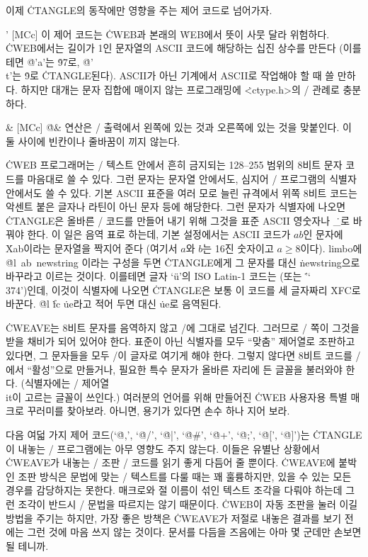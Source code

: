 \subsec
이제 \.{CTANGLE}의 동작에만 영향을 주는 제어 코드로 넘어가자.

\@' [MCc] 이 제어 코드는 \.{CWEB}과 본래의 \.{WEB}에서 뜻이 사뭇 달라 위험하다.
\.{CWEB}에서는 길이가 1인 문자열의 ASCII 코드에 해당하는 십진 상수를 만든다
(이를테면 \.{@'a'}는 \.{97}로, \.{@'\\t'}는 \.9로 \.{CTANGLE}된다). ASCII가
아닌 기계에서 ASCII로 작업해야 할 때 쓸 만하다. 하지만 대개는 문자 집합에 매이지
않는 프로그래밍에 \.{<ctype.h>}의 \CEE/ 관례로 충분하다.

\@\& [MCc] \.{@\&} 연산은 \CEE/ 출력에서 왼쪽에 있는 것과 오른쪽에 있는 것을
맞붙인다. 이 둘 사이에 빈칸이나 줄바꿈이 끼지 않는다.

\@l [L] \.{CWEB} 프로그래머는 \TEX/ 텍스트 안에서 흔히 금지되는 128--255 범위의
8비트 문자 코드를 마음대로 쓸 수 있다. 그런 문자는 문자열 안에서도, 심지어
\CEE/ 프로그램의 식별자 안에서도 쓸 수 있다. 기본 ASCII 표준을 여러 모로 늘린
규격에서 위쪽 8비트 코드는 악센트 붙은 글자나 라틴이 아닌 문자 등에 해당한다.
그런 문자가 식별자에 나오면 \.{CTANGLE}은 올바른 \CEE/ 코드를 만들어 내기 위해
그것을 표준 ASCII 영숫자나 \.{\_}로 바꿔야 한다. 이 일은 음역 표로 하는데, 기본
설정에서는 ASCII 코드가 \T{\^}$ab$인 문자에 \.{Xab}이라는 문자열을 짝지어 준다
(여기서 $a$와 $b$는 16진 숫자이고 $a\ge8$이다). limbo에 \.{@l\ ab\ newstring}
이라는 구성을 두면 \.{CTANGLE}에게 그 문자를 대신 \.{newstring}으로 바꾸라고
이르는 것이다. 이를테면 글자 `\"u'의 ISO Latin-1 코드는 
(또는 \.{'\char`\\374'})인데, 이것이 식별자에 나오면 \.{CTANGLE}은 보통 이 코드를
세 글자짜리 \.{XFC}로 바꾼다. \.{@l} \.{fc} \.{ue}라고 적어 두면 대신 \.{ue}로
음역된다.

\more \.{CWEAVE}는 8비트 문자를 음역하지 않고 \TEX/에 그대로 넘긴다. 그러므로
\TEX/ 쪽이 그것을 받을 채비가 되어 있어야 한다. 표준이 아닌 식별자를 모두
``맞춤'' 제어열로 조판하고 있다면, 그 문자들을 모두 \TEX/이 글자로 여기게 해야
한다. 그렇지 않다면 8비트 코드를 \TEX/에서 ``활성''으로 만들거나, 필요한 특수
문자가 올바른 자리에 든 글꼴을 불러와야 한다. (식별자에는 \TEX/ 제어열 \.{\\it}이
고르는 글꼴이 쓰인다.) 여러분의 언어를 위해 만들어진 \.{CWEB} 사용자용 특별 매크로
꾸러미를 찾아보라. 아니면, 용기가 있다면 손수 하나 지어 보라.

\subsec
다음 여덟 가지 제어 코드(`\.{@,}', `\.{@/}', `\.{@|}', `\.{@\#}', `\.{@+}',
`\.{@;}', `\.{@[}', `\.{@]}')는 \.{CTANGLE}이 내놓는 \CEE/ 프로그램에는 아무
영향도 주지 않는다. 이들은 유별난 상황에서 \.{CWEAVE}가 내놓는 \TEX/ 조판 \CEE/
코드를 읽기 좋게 다듬어 줄 뿐이다. \.{CWEAVE}에 붙박인 조판 방식은 문법에 맞는
\CEE/ 텍스트를 다룰 때는 꽤 훌륭하지만, 있을 수 있는 모든 경우를 감당하지는
못한다. 매크로와 절 이름이 섞인 텍스트 조각을 다뤄야 하는데 그런 조각이 반드시
\CEE/ 문법을 따르지는 않기 때문이다. \.{CWEB}이 자동 조판을 눌러 이길 방법을
주기는 하지만, 가장 좋은 방책은 \.{CWEAVE}가 저절로 내놓은 결과를 보기 전에는 그런
것에 마음 쓰지 않는 것이다. 문서를 다듬을 즈음에는 아마 몇 군데만 손보면 될
테니까.

